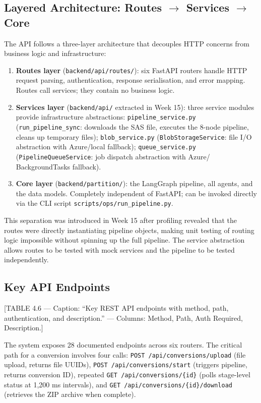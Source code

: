\subsection{Layered Architecture: Routes $\to$ Services $\to$ Core}
\label{subsec:layered-api}

The API follows a three-layer architecture that decouples HTTP concerns from
business logic and infrastructure:

\begin{enumerate}
  \item \textbf{Routes layer} (\texttt{backend/api/routes/}): six FastAPI
    routers handle HTTP request parsing, authentication, response serialisation,
    and error mapping. Routes call services; they contain no business logic.
  \item \textbf{Services layer} (\texttt{backend/api/} extracted in Week 15):
    three service modules provide infrastructure abstractions:
    \texttt{pipeline\_service.py} (\texttt{run\_pipeline\_sync}: downloads the
    SAS file, executes the 8-node pipeline, cleans up temporary files);
    \texttt{blob\_service.py} (\texttt{BlobStorageService}: file I/O abstraction
    with Azure/local fallback); \texttt{queue\_service.py}
    (\texttt{PipelineQueueService}: job dispatch abstraction with Azure/
    BackgroundTasks fallback).
  \item \textbf{Core layer} (\texttt{backend/partition/}): the LangGraph
    pipeline, all agents, and the data models. Completely independent of FastAPI;
    can be invoked directly via the CLI script
    \texttt{scripts/ops/run\_pipeline.py}.
\end{enumerate}

This separation was introduced in Week 15 after profiling revealed that the
routes were directly instantiating pipeline objects, making unit testing of
routing logic impossible without spinning up the full pipeline. The service
abstraction allows routes to be tested with mock services and the pipeline to
be tested independently.

\subsection{Key API Endpoints}
\label{subsec:key-endpoints}

[TABLE 4.6 --- Caption: ``Key REST API endpoints with method, path, authentication,
and description.'' --- Columns: Method, Path, Auth Required, Description.]

The system exposes 28 documented endpoints across six routers. The critical
path for a conversion involves four calls: \texttt{POST /api/conversions/upload}
(file upload, returns file UUIDs), \texttt{POST /api/conversions/start}
(triggers pipeline, returns conversion ID), repeated
\texttt{GET /api/conversions/\{id\}} (polls stage-level status at 1,200 ms
intervals), and \texttt{GET /api/conversions/\{id\}/download} (retrieves
the ZIP archive when complete).

